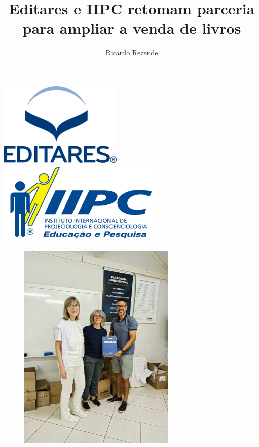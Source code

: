 \documentclass{gescons}
\author{Ricardo Rezende}
\title{Editares e IIPC retomam parceria para ampliar a venda de livros}
\begin{document}
    \makeentrevistatitle


    
    

\begin{center}
    \includegraphics[height=4cm]{images/Logo-Editares-com-Marca-Registrada.png}
    \hspace{3cm}
    \includegraphics[height=4cm]{images/IIPC_logo.png} 
\end{center}

    


\begin{figure}
  \hspace{1mm}\includegraphics[height=10cm]{articles/parceria/imagens/editares-iipc.jpeg}
\end{figure}
\end{document}
